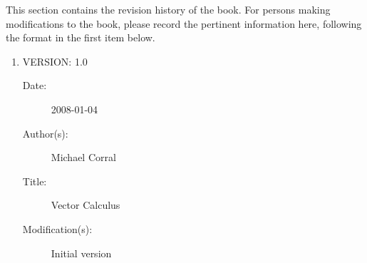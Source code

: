 \documentclass[letterpaper,11pt,titlepage,openany,twoside,numbers=noenddot,bibliography=totoc,index=totoc]{scrbook}
\theoremstyle{definition}
\theoremstyle{itexmp}
\newcommand\myclearpage{\cleartooddpage
 [\thispagestyle{empty}]}
\numberwithin{figure}{section}
\begin{document}
\lowertitleback{Copyright \copyright ~2008 ~Michael Corral.\\
Permission is granted to copy, distribute and/or modify this document
under the terms of the GNU Free Documentation License, Version 1.2
or any later version published by the Free Software Foundation;
with no Invariant Sections, no Front-Cover Texts, and no Back-Cover
Texts. A copy of the license is included in the section entitled ``GNU
Free Documentation License''.}
\maketitle
\pagestyle{fancy}
\renewcommand{\sectionmark}[1]{\markright{\thesection\ #1}}
\renewcommand{\biblnfont}{\textnormal}
\renewcommand{\bibfnfont}{\textnormal}
\renewcommand{\bibtfont}{\textit}
\renewcommand{\bibansep}{, }
\renewcommand{\bibatsep}{,}
\renewcommand{\bibbdsep}{,}
\renewcommand{\qedsymbol}{\textsf{\textbf{\textsc{\footnotesize{QED}}}}}
\fancyhf{}
\fancyhead[LE]{\sffamily\bfseries\thepage}
\fancyhead[CE]{\sffamily\bfseries\leftmark}
\fancyhead[CO]{\sffamily\bfseries\rightmark}
\fancyhead[RO]{\sffamily\bfseries\thepage}

\tableofcontents
\mainmatter




\newpage

\nocite{*}

%
%
\newpage

This section contains the revision history of the book.  For persons making modifications to 
the book, please record the pertinent information here, following the format in the first item below.

\begin{enumerate}

\item VERSION: 1.0
\begin{description}
\item[Date:] 2008-01-04
\item[Author(s):] Michael Corral
\item[Title:] Vector Calculus
\item[Modification(s):] Initial version
\end{description}

\end{enumerate}

\backmatter
\clearpage
{}
\printindex

\myclearpage
\end{document}
